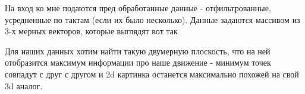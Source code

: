 На вход ко мне подаются пред обработанные данные - отфильтрованные, усредненные по тактам (если их было несколько). Данные задаются массивом из 3-х мерных векторов, которые выглядят вот так
\begin{figure}[H]
\end{figure}
Для наших данных хотим найти такую двумерную плоскость, что на ней отобразится максимум информации про наше движение - минимум точек совпадут с друг с другом и 2d картинка останется максимально похожей на свой 3d аналог. 

